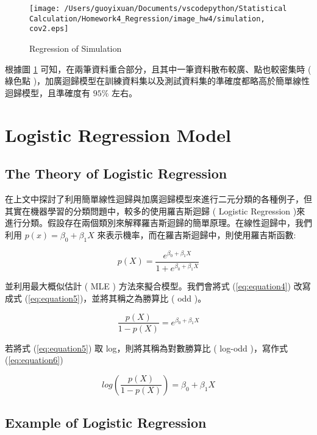 \begin{itemize}
\begin{figure}[H]
    \centering
        \texttt{[image: /Users/guoyixuan/Documents/vscodepython/Statistical Calculation/Homework4\_Regression/image\_hw4/simulation, cov2.eps]}
    \caption{Regression of Simulation}
    \label{fig:Regression of cov2}
\end{figure}

根據圖 \ref{fig:Regression of cov2} 可知，在兩筆資料重合部分，且其中一筆資料散布較廣、點也較密集時 ( 綠色點 )，加廣迴歸模型在訓練資料集以及測試資料集的準確度都略高於簡單線性迴歸模型，且準確度有 $95\%$ 左右。

\end{itemize}

\section{Logistic Regression Model}

\subsection{The Theory of Logistic Regression}

在上文中探討了利用簡單線性迴歸與加廣迴歸模型來進行二元分類的各種例子，但其實在機器學習的分類問題中，較多的使用羅吉斯迴歸 ( Logistic Regression )來進行分類。假設存在兩個類別來解釋羅吉斯迴歸的簡單原理。在線性迴歸中，我們利用 $p(x)=\beta_0+\beta_1 X$ 來表示機率，而在羅吉斯迴歸中，則使用羅吉斯函數:

\begin{equation}\label{eq:equation4}
p(X)=\frac{e^{\beta_0+\beta_1 X}}{1+e^{\beta_0+\beta_1 X}}
\end{equation}

並利用最大概似估計 ( MLE ) 方法來擬合模型。我們會將式 (\ref{eq:equation4}) 改寫成式 (\ref{eq:equation5})，並將其稱之為勝算比 ( odd )。

\begin{equation}\label{eq:equation5}
\frac{p(X)}{1-p(X)}=e^{\beta_0+\beta_1 X}
\end{equation}

若將式 (\ref{eq:equation5}) 取 log，則將其稱為對數勝算比 ( log-odd )，寫作式 (\ref{eq:equation6})

\begin{equation}\label{eq:equation6}
log(\frac{p(X)}{1-p(X)})=\beta_0+\beta_1 X
\end{equation}

\subsection{Example of Logistic Regression}

